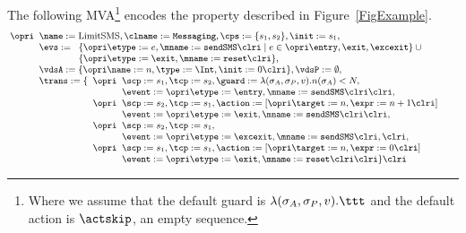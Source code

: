 The following MVA\footnote{Where we assume that the default guard is
\(\lambda(\sigma_A, \sigma_P, v). \ttt\) and the default action is
\(\actskip\), an empty sequence.}
encodes the property described in Figure~\ref{FigExample}.
\[
\small{
\hspace{-0.3em}
\begin{array}[t]{l}
\opri
\begin{array}[t]{l}
\name := \textrm{LimitSMS}, \clname := \texttt{Messaging},
\cps := \{s_1, s_2\},
\init := s_1,\\
\evs :=
\begin{array}[t]{l}
\{ \opri \etype := e, \mname := \texttt{sendSMS} \clri \mid e \in \opri \entry,
\exit, \excexit \} \:\cup \\
\{ \opri \etype := \exit, \mname := \texttt{reset} \clri\},
\end{array}
\\
\vdsA := \{\opri \name := n, \type := \Int, \init := 0 \clri\},
\vdsP := \emptyset,\\
\trans := \{
\begin{array}[t]{l}
\opri
 \begin{array}[t]{l}
\scp := s_1, \tcp := s_2, \guard := \lambda(\sigma_A, \sigma_P, v). n(\sigma_A) < N,\\
             \event := \opri \etype := \entry,
                             \mname := \texttt{sendSMS} \clri \clri,
\end{array}\\
\opri
 \begin{array}[t]{l}
\scp := s_2, \tcp := s_1, \action := [\opri \target := n, \expr := n + 1 \clri]\\
             \event := \opri \etype := \exit,
                             \mname := \texttt{sendSMS} \clri \clri,
\end{array}\\
\opri
 \begin{array}[t]{l}
\scp := s_2, \tcp := s_1, \\
             \event := \opri \etype := \excexit,
                             \mname := \texttt{sendSMS} \clri, \clri,
\end{array}\\
\opri
\begin{array}[t]{l}
\scp := s_1, \tcp := s_1, \action := [\opri \target := n, \expr := 0 \clri] \\
             \event := \opri \etype := \exit, \mname := \texttt{reset} \clri \clri
\} \clri
\end{array}
\end{array}
\end{array}\\
\end{array}
}\]


